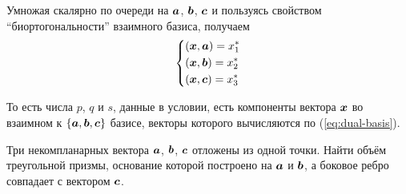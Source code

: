 \documentclass[a4paper,12pt]{article}
\begin{document}
\begin{solution}
    Умножая скалярно по очереди на $\boldsymbol a$, $\boldsymbol b$, $\boldsymbol c$ и пользуясь свойством ``биортогональности'' взаимного базиса, получаем
    \[
      \left\{
        \begin{aligned}
          &(\boldsymbol x, \boldsymbol a) = x_1^*\\
          &(\boldsymbol x, \boldsymbol b) = x_2^*\\
          &(\boldsymbol x, \boldsymbol c) = x_3^*
        \end{aligned}
      \right.
    \]
    
    То есть числа $p$, $q$ и $s$, данные в условии, есть компоненты вектора $\boldsymbol x$ во взаимном к $\{\boldsymbol a, \boldsymbol b, \boldsymbol c\}$ базисе, векторы которого вычисляются по (\ref{eq:dual-basis}).
  \end{solution}
  
  
  \begin{problem}[3.22(1)]
    Три некомпланарных вектора $\boldsymbol a$, $\boldsymbol b$, $\boldsymbol c$ отложены из одной точки.
    Найти объём треугольной призмы, основание которой построено на $\boldsymbol a$ и $\boldsymbol b$, а боковое ребро совпадает с вектором $\boldsymbol c$.
  \end{problem}
  
\end{document}

